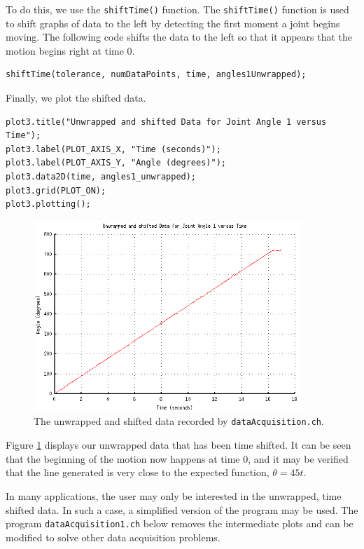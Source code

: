 \documentclass{article}
\begin{document}
To do this, we use the \texttt{shiftTime()} function. The \texttt{shiftTime()} function
is used to shift graphs of data to the left by detecting the first moment a joint begins
moving. The following code shifts the data to the left so that it appears that the motion begins
right at time 0.
\begin{verbatim}
shiftTime(tolerance, numDataPoints, time, angles1Unwrapped);
\end{verbatim}

Finally, we plot the shifted data.

\begin{verbatim}
plot3.title("Unwrapped and shifted Data for Joint Angle 1 versus Time");
plot3.label(PLOT_AXIS_X, "Time (seconds)");
plot3.label(PLOT_AXIS_Y, "Angle (degrees)");
plot3.data2D(time, angles1_unwrapped);
plot3.grid(PLOT_ON);
plot3.plotting();
\end{verbatim}

\begin{figure}[H]
\centering
\includegraphics[width=4in]{images/dataacq1_plot3.png}
\caption{\label{fig:dataacq1_fig3} The unwrapped and shifted data recorded by \texttt{dataAcquisition.ch}.}
\end{figure}

Figure \ref{fig:dataacq1_fig3}  displays our unwrapped data that has been time shifted. It can be seen
that the beginning of the motion now happens at time 0, and it may be verified that the
line generated is very close to the expected function, $\theta = 45 t$.

In many applications, the user may only be interested in the unwrapped, time shifted data. 
In such a case, a simplified version of the program may be used. The program 
\texttt{dataAcquisition1.ch} below removes the intermediate plots and can be modified
to solve other data acquisition problems.
\end{document}
